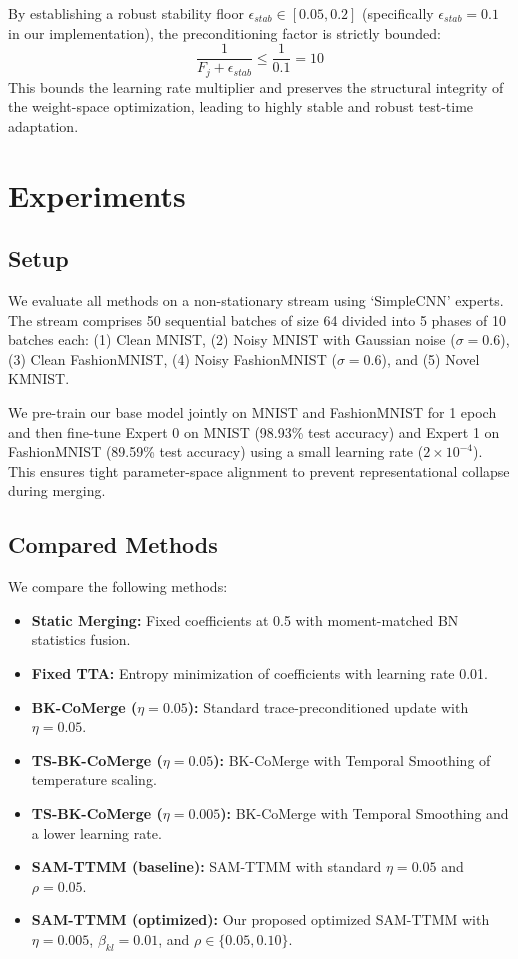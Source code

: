 \documentclass{article}
\theoremstyle{plain}
\theoremstyle{definition}
\theoremstyle{remark}
\begin{document}
By establishing a robust stability floor $\epsilon_{stab} \in [0.05, 0.2]$ (specifically $\epsilon_{stab} = 0.1$ in our implementation), the preconditioning factor is strictly bounded:
\begin{equation}
    \frac{1}{F_j + \epsilon_{stab}} \le \frac{1}{0.1} = 10
\end{equation}
This bounds the learning rate multiplier and preserves the structural integrity of the weight-space optimization, leading to highly stable and robust test-time adaptation.

\section{Experiments}
\label{sec:experiments}

\subsection{Setup}
We evaluate all methods on a non-stationary stream using `SimpleCNN' experts. The stream comprises 50 sequential batches of size 64 divided into 5 phases of 10 batches each: (1) Clean MNIST, (2) Noisy MNIST with Gaussian noise ($\sigma = 0.6$), (3) Clean FashionMNIST, (4) Noisy FashionMNIST ($\sigma = 0.6$), and (5) Novel KMNIST.

We pre-train our base model jointly on MNIST and FashionMNIST for 1 epoch and then fine-tune Expert 0 on MNIST (98.93\% test accuracy) and Expert 1 on FashionMNIST (89.59\% test accuracy) using a small learning rate ($2 \times 10^{-4}$). This ensures tight parameter-space alignment to prevent representational collapse during merging.

\subsection{Compared Methods}
We compare the following methods:
\begin{itemize}
    \item \textbf{Static Merging:} Fixed coefficients at 0.5 with moment-matched BN statistics fusion.
    \item \textbf{Fixed TTA:} Entropy minimization of coefficients with learning rate 0.01.
    \item \textbf{BK-CoMerge ($\eta=0.05$):} Standard trace-preconditioned update with $\eta=0.05$.
    \item \textbf{TS-BK-CoMerge ($\eta=0.05$):} BK-CoMerge with Temporal Smoothing of temperature scaling.
    \item \textbf{TS-BK-CoMerge ($\eta=0.005$):} BK-CoMerge with Temporal Smoothing and a lower learning rate.
    \item \textbf{SAM-TTMM (baseline):} SAM-TTMM with standard $\eta=0.05$ and $\rho=0.05$.
    \item \textbf{SAM-TTMM (optimized):} Our proposed optimized SAM-TTMM with $\eta=0.005$, $\beta_{kl}=0.01$, and $\rho \in \{0.05, 0.10\}$.
\end{itemize}
\end{document}
